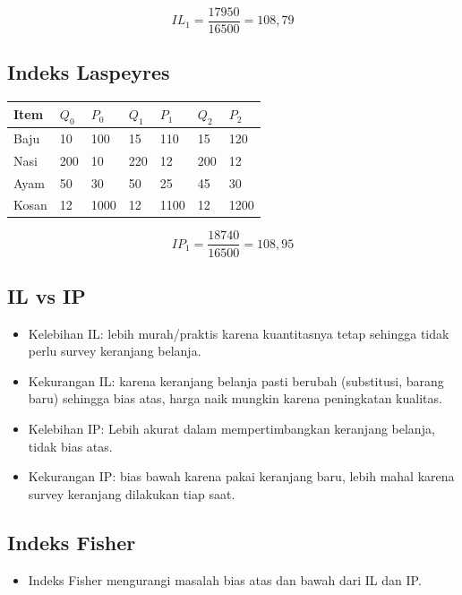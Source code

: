 \documentclass[
  letterpaper,
  DIV=11,
  numbers=noendperiod]{scrartcl}
\providecommand{\tightlist}{%
  \setlength{\itemsep}{0pt}\setlength{\parskip}{0pt}}\usepackage{longtable,booktabs,array}
\begin{document}
\[
IL_1=\frac{17950}{16500}=108,79
\]

\hypertarget{indeks-laspeyres-2}{%
\subsection{Indeks Laspeyres}\label{indeks-laspeyres-2}}

\begin{longtable}[]{@{}lllllll@{}}
\toprule\noalign{}
Item & \(Q_0\) & \(P_0\) & \(Q_1\) & \(P_1\) & \(Q_2\) & \(P_2\) \\
\midrule\noalign{}
\endhead
\bottomrule\noalign{}
\endlastfoot
Baju & 10 & 100 & 15 & 110 & 15 & 120 \\
Nasi & 200 & 10 & 220 & 12 & 200 & 12 \\
Ayam & 50 & 30 & 50 & 25 & 45 & 30 \\
Kosan & 12 & 1000 & 12 & 1100 & 12 & 1200 \\
\end{longtable}

\[
IP_1=\frac{18740}{16500}=108,95
\]

\hypertarget{il-vs-ip}{%
\subsection{IL vs IP}\label{il-vs-ip}}

\begin{itemize}
\item
  Kelebihan IL: lebih murah/praktis karena kuantitasnya tetap sehingga
  tidak perlu survey keranjang belanja.
\item
  Kekurangan IL: karena keranjang belanja pasti berubah (substitusi,
  barang baru) sehingga bias atas, harga naik mungkin karena peningkatan
  kualitas.
\item
  Kelebihan IP: Lebih akurat dalam mempertimbangkan keranjang belanja,
  tidak bias atas.
\item
  Kekurangan IP: bias bawah karena pakai keranjang baru, lebih mahal
  karena survey keranjang dilakukan tiap saat.
\end{itemize}

\hypertarget{indeks-fisher}{%
\subsection{Indeks Fisher}\label{indeks-fisher}}

\begin{itemize}
\tightlist
\item
  Indeks Fisher mengurangi masalah bias atas dan bawah dari IL dan IP.
\end{itemize}
\end{document}
